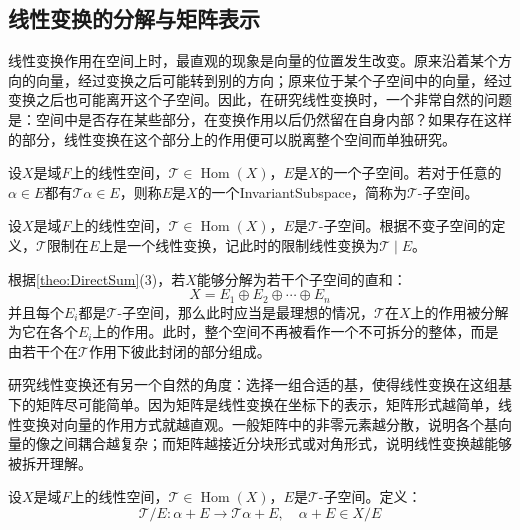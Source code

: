\subsection{线性变换的分解与矩阵表示}
线性变换作用在空间上时，最直观的现象是向量的位置发生改变。原来沿着某个方向的向量，经过变换之后可能转到别的方向；原来位于某个子空间中的向量，经过变换之后也可能离开这个子空间。因此，在研究线性变换时，一个非常自然的问题是：空间中是否存在某些部分，在变换作用以后仍然留在自身内部？如果存在这样的部分，线性变换在这个部分上的作用便可以脱离整个空间而单独研究。
\begin{definition}
	设$X$是域$F$上的线性空间，$\mathcal{T}\in\operatorname{Hom}(X)$，$E$是$X$的一个子空间。若对于任意的$\alpha\in E$都有$\mathcal{T}\alpha\in E$，则称$E$是$X$的一个\gls{InvariantSubspace}，简称为$\mathcal{T}$-子空间。
\end{definition}
\begin{definition}
	设$X$是域$F$上的线性空间，$\mathcal{T}\in\operatorname{Hom}(X)$，$E$是$\mathcal{T}$-子空间。根据不变子空间的定义，$\mathcal{T}$限制在$E$上是一个线性变换，记此时的限制线性变换为$\mathcal{T}\mid E$。
\end{definition}
根据\cref{theo:DirectSum}(3)，若$X$能够分解为若干个子空间的直和：
\begin{equation*}
	X=E_1\oplus E_2\oplus\cdots\oplus E_n
\end{equation*}
并且每个$E_i$都是$\mathcal{T}$-子空间，那么此时应当是最理想的情况，$\mathcal{T}$在$X$上的作用被分解为它在各个$E_i$上的作用。此时，整个空间不再被看作一个不可拆分的整体，而是由若干个在$\mathcal{T}$作用下彼此封闭的部分组成。\par
研究线性变换还有另一个自然的角度：选择一组合适的基，使得线性变换在这组基下的矩阵尽可能简单。因为矩阵是线性变换在坐标下的表示，矩阵形式越简单，线性变换对向量的作用方式就越直观。一般矩阵中的非零元素越分散，说明各个基向量的像之间耦合越复杂；而矩阵越接近分块形式或对角形式，说明线性变换越能够被拆开理解。
\begin{definition}
	设$X$是域$F$上的线性空间，$\mathcal{T}\in\operatorname{Hom}(X)$，$E$是$\mathcal{T}$-子空间。定义：
	\begin{equation*}
		\mathcal{T}/E:\alpha+E\to\mathcal{T}\alpha+E,\quad\alpha+E\in X/E
	\end{equation*}
\end{definition}
